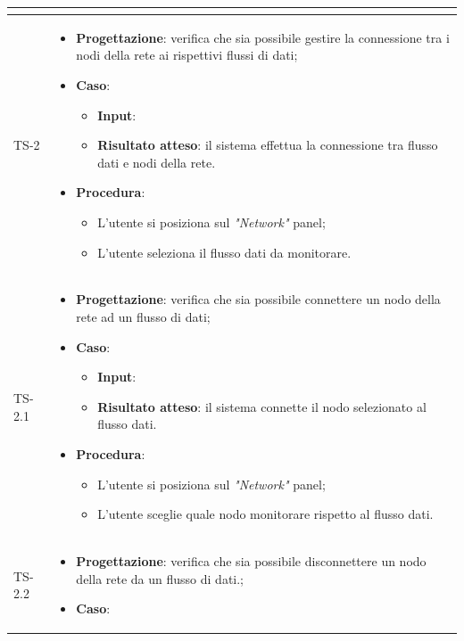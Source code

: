 \begin{longtable}{|C{2.5cm}|C{13cm}|}
\begin{itemize}
\begin{itemize}
	\end{itemize} 
\end{itemize}\\
	\hline
	{TS-2} & 
\begin{itemize}
	\item \textbf{Progettazione}: verifica che sia possibile gestire la
	connessione tra i nodi della rete ai rispettivi flussi di dati;
	\item \textbf{Caso}: 
	\begin{itemize}
		\item \textbf{Input}: 
		\item \textbf{Risultato atteso}: il sistema effettua la connessione tra flusso dati e nodi della rete.
	\end{itemize}
	\item \textbf{Procedura}:
	\begin{itemize}
		\item L'utente si posiziona sul \emph{"Network"} panel;
		\item L'utente seleziona il flusso dati da monitorare.
	\end{itemize} 
\end{itemize} \\
	\hline
	{TS-2.1} &
\begin{itemize}
	\item \textbf{Progettazione}: verifica che sia possibile connettere un
	nodo della rete ad un flusso di dati;
	\item \textbf{Caso}: 
	\begin{itemize}
		\item \textbf{Input}: 
		\item \textbf{Risultato atteso}: il sistema connette il nodo selezionato al flusso dati.
	\end{itemize}
	\item \textbf{Procedura}:
	\begin{itemize}
		\item L'utente si posiziona sul \emph{"Network"} panel;
		\item L'utente sceglie quale nodo monitorare rispetto al flusso dati.
	\end{itemize} 
\end{itemize}	
	 \\
	\hline
	{TS-2.2} &
\begin{itemize}
	\item \textbf{Progettazione}: verifica che sia possibile disconnettere un
	nodo della rete da un flusso di dati.;
	\item \textbf{Caso}: 

\end{itemize}
\end{longtable}
